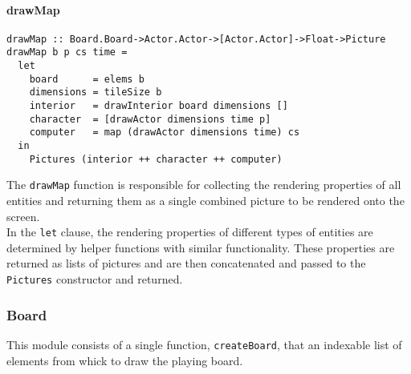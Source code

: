 \documentclass{article}
\begin{document}
        \paragraph{drawMap}
        \begin{verbatim}
drawMap :: Board.Board->Actor.Actor->[Actor.Actor]->Float->Picture
drawMap b p cs time =
  let
    board      = elems b
    dimensions = tileSize b
    interior   = drawInterior board dimensions []
    character  = [drawActor dimensions time p]
    computer   = map (drawActor dimensions time) cs
  in
    Pictures (interior ++ character ++ computer)
        \end{verbatim}
        The \texttt{drawMap} function is responsible for collecting the rendering properties of all entities and returning them as a single combined picture to be rendered onto the screen.\\
        \newline
In the \texttt{let} clause, the rendering properties of different types of entities are determined by helper functions with similar functionality. These properties are returned as lists of pictures and are then concatenated and passed to the \texttt{Pictures} constructor and returned.
        \subsubsection{Board}
        This module consists of a single function, \texttt{createBoard}, that an indexable list of elements from whick to draw the playing board.
\end{document}
